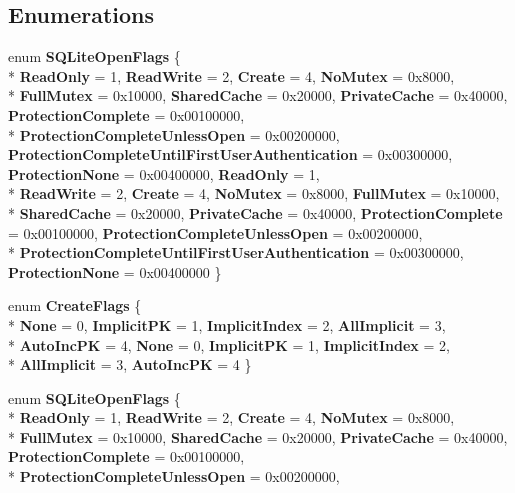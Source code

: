 \subsection*{Enumerations}
\begin{DoxyCompactItemize}
\item 
enum {\bfseries S\-Q\-Lite\-Open\-Flags} \{ \\*
{\bfseries Read\-Only} = 1, 
{\bfseries Read\-Write} = 2, 
{\bfseries Create} = 4, 
{\bfseries No\-Mutex} = 0x8000, 
\\*
{\bfseries Full\-Mutex} = 0x10000, 
{\bfseries Shared\-Cache} = 0x20000, 
{\bfseries Private\-Cache} = 0x40000, 
{\bfseries Protection\-Complete} = 0x00100000, 
\\*
{\bfseries Protection\-Complete\-Unless\-Open} = 0x00200000, 
{\bfseries Protection\-Complete\-Until\-First\-User\-Authentication} = 0x00300000, 
{\bfseries Protection\-None} = 0x00400000, 
{\bfseries Read\-Only} = 1, 
\\*
{\bfseries Read\-Write} = 2, 
{\bfseries Create} = 4, 
{\bfseries No\-Mutex} = 0x8000, 
{\bfseries Full\-Mutex} = 0x10000, 
\\*
{\bfseries Shared\-Cache} = 0x20000, 
{\bfseries Private\-Cache} = 0x40000, 
{\bfseries Protection\-Complete} = 0x00100000, 
{\bfseries Protection\-Complete\-Unless\-Open} = 0x00200000, 
\\*
{\bfseries Protection\-Complete\-Until\-First\-User\-Authentication} = 0x00300000, 
{\bfseries Protection\-None} = 0x00400000
 \}
\item 
enum {\bfseries Create\-Flags} \{ \\*
{\bfseries None} = 0, 
{\bfseries Implicit\-P\-K} = 1, 
{\bfseries Implicit\-Index} = 2, 
{\bfseries All\-Implicit} = 3, 
\\*
{\bfseries Auto\-Inc\-P\-K} = 4, 
{\bfseries None} = 0, 
{\bfseries Implicit\-P\-K} = 1, 
{\bfseries Implicit\-Index} = 2, 
\\*
{\bfseries All\-Implicit} = 3, 
{\bfseries Auto\-Inc\-P\-K} = 4
 \}
\item 
enum {\bfseries S\-Q\-Lite\-Open\-Flags} \{ \\*
{\bfseries Read\-Only} = 1, 
{\bfseries Read\-Write} = 2, 
{\bfseries Create} = 4, 
{\bfseries No\-Mutex} = 0x8000, 
\\*
{\bfseries Full\-Mutex} = 0x10000, 
{\bfseries Shared\-Cache} = 0x20000, 
{\bfseries Private\-Cache} = 0x40000, 
{\bfseries Protection\-Complete} = 0x00100000, 
\\*
{\bfseries Protection\-Complete\-Unless\-Open} = 0x00200000, 

\end{DoxyCompactItemize}
